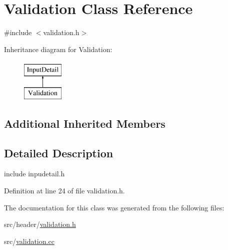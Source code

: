 \hypertarget{classValidation}{\section{Validation Class Reference}
\label{classValidation}
}


{\ttfamily \#include $<$validation.\-h$>$}

Inheritance diagram for Validation\-:\begin{figure}[H]
\begin{center}
\leavevmode
\includegraphics[height=2.000000cm]{classValidation}
\end{center}
\end{figure}
\subsection*{Additional Inherited Members}


\subsection{Detailed Description}
include inpudetail.\-h 

Definition at line 24 of file validation.\-h.



The documentation for this class was generated from the following files\-:\begin{DoxyCompactItemize}
\item 
src/header/\hyperlink{validation_8h}{validation.\-h}\item 
src/\hyperlink{validation_8cc}{validation.\-cc}\end{DoxyCompactItemize}
